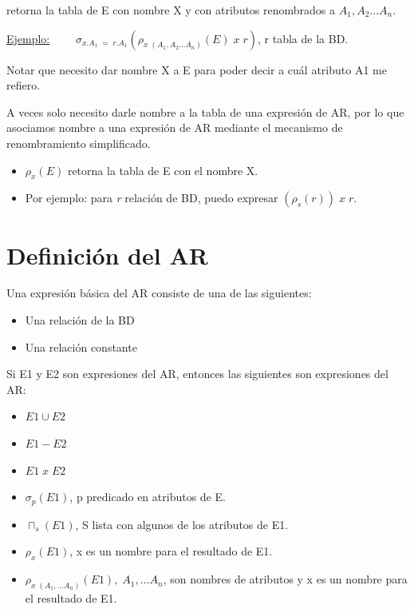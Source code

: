 \documentclass[12pt,a4paper]{report}
\begin{document}
			\par retorna la tabla de E con nombre X y con atributos renombrados a $A_{1}, A_{2} \dotsc A_{n}$.

			\vspace{5mm}
			\underline{Ejemplo:}
			$\qquad \sigma_{x . A_{1} \; = \; r . A_{1}}(\rho_{x \; (A_{1}, A_{2} \dotsc A_{n})} (E) \; x \; r) $, r tabla de la BD.
			\vspace{5mm}
			\par Notar que necesito dar nombre X a E para poder decir a cuál atributo A1 me refiero.
			\vspace{5mm}			
			\par A veces solo necesito darle nombre a la tabla de una expresión de AR, por lo que asociamos nombre a una expresión de AR mediante el mecanismo de renombramiento simplificado.
\begin{itemize}
	\item $\rho_{x}(E)$ retorna la tabla de E con el nombre X.
	\item Por ejemplo: para \textit{r} relación de BD, puedo expresar $(\rho_{s}(r)) \; x \; r$.
\end{itemize}


	\section{Definición del AR}
		\par Una expresión básica del AR consiste de una de las siguientes:
		\begin{itemize}
			\item Una relación de la BD
			\item Una relación constante
		\end{itemize}		 
		\par Si E1 y E2 son expresiones del AR, entonces las siguientes son expresiones del AR:
		\begin{itemize}
			\item $E1\cup E2$
			\item $E1 - E2$
			\item $E1\; x \; E2$
			\item $\sigma_{p}(E1)$, p predicado en atributos de E.
			\item $\sqcap_{s}(E1)$, S lista con algunos de los atributos de E1.
			\item $\rho_{x}(E1)$, x es un nombre para el resultado de E1.
			\item $\rho_{x \; (A_{1}, \dotsc A_{n})}(E1), \; A_{1}, \dotsc A_{n}$, son nombres de atributos y x es un nombre para el resultado de E1.
		\end{itemize}
\end{document}
